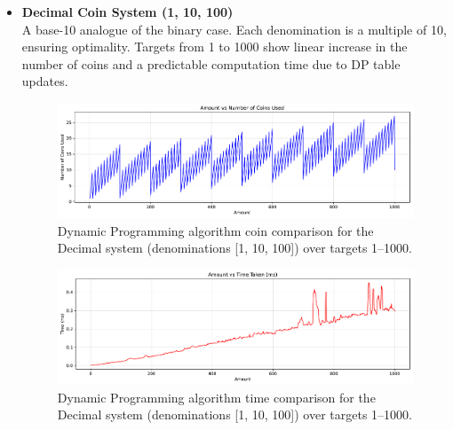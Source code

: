 \documentclass[12pt,a4paper]{report}
\begin{document}
\begin{itemize}
  \item \textbf{Decimal Coin System (1, 10, 100)}\\
  A base-10 analogue of the binary case. Each denomination is a multiple of 10, ensuring optimality. Targets from 1 to 1000 show linear increase in the number of coins and a predictable computation time due to DP table updates.\\
  \begin{figure}[H]
    \centering
    \includegraphics[width=\textwidth]{graphs/dp_coins_decimal_plot.pdf}
    \caption{Dynamic Programming algorithm coin comparison for the Decimal system (denominations [1, 10, 100]) over targets 1--1000.}
    \label{fig:dp_coins_decimal_plot}
  \end{figure}
  \begin{figure}[H]
    \centering
    \includegraphics[width=\textwidth]{graphs/dp_time_decimal_plot.pdf}
    \caption{Dynamic Programming algorithm time comparison for the Decimal system (denominations [1, 10, 100]) over targets 1--1000.}
    \label{fig:dp_time_decimal_plot}
  \end{figure}


\end{itemize}
\end{document}
